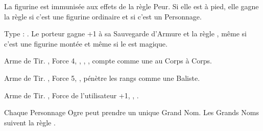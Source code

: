\closearmywiderules

\vspace*{1.5cm}
\startarmyspecialrules

\armyspecialruleentry{\sonsoftheavalanche}

La figurine est immunisée aux effets de la règle Peur. Si elle est à pied, elle gagne la règle  si c'est une figurine ordinaire et  si c'est un Personnage.

\closearmyspecialrules

\vspace*{1.5cm}
\startarmyarmoury

\startitemlistonecol

\listitemonecol{\ironfist} Type : \pw{}. Le porteur gagne +1 à sa Sauvegarde d'Armure et la règle \parry{}, même si c'est une figurine montée et même si le \ironfist{} est magique.

\listitemonecol{\braceofogrepistols} Arme de Tir. , Force 4, , , \quicktofire{}, compte comme une \pw{} au Corps à Corps.

\listitemonecol{\ogrecrossbow} Arme de Tir. , Force 5, , pénètre les rangs comme une Baliste.

\listitemonecol{\huntingspear} Arme de Tir. , Force de l'utilisateur +1, , \quicktofire{}.

\enditemlistonecol

\closearmyarmoury



\spaceaftersection{}

Chaque Personnage Ogre peut prendre un unique Grand Nom. Les Grands Noms suivent la règle \oneperarmy{}.

